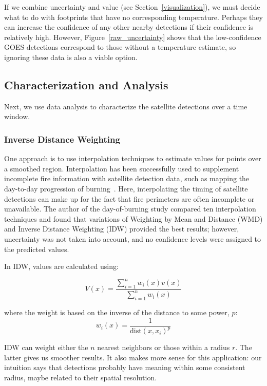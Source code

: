 If we combine uncertainty and value (see Section~\ref{visualization}), we must decide what to do with footprints that have no corresponding temperature. Perhaps they can increase the confidence of any other nearby detections if their confidence is relatively high. However, Figure~\ref{raw_uncertainty} shows that the low-confidence GOES detections correspond to those without a temperature estimate, so ignoring these data is also a viable option.

\subsection{Characterization and Analysis}
Next, we use data analysis to characterize the satellite detections over a time window. 
\subsubsection{Inverse Distance Weighting}
One approach is to use interpolation techniques to estimate values for points over a smoothed region. Interpolation has been successfully used to supplement incomplete fire information with satellite detection data, such as mapping the day-to-day progression of burning~\cite{Parks2014}. Here, interpolating the timing of satellite detections can make up for the fact that fire perimeters are often incomplete or unavailable. The author of the day-of-burning study compared ten interpolation techniques and found that variations of Weighting by Mean and Distance (WMD) and Inverse Distance Weighting (IDW) provided the best results; however, uncertainty was not taken into account, and no confidence levels were assigned to the predicted values.

In IDW, values are calculated using:

\begin{equation}
V(x) = \frac{\sum_{i=1}^{n}w_i(x)v(x)}{\sum_{i=1}^{n}w_i(x)}
\end{equation}

where the weight is based on the inverse of the distance to some power, $p$:
\begin{equation}
w_i(x) = \frac{1}{\mathrm{dist}(x, x_i)^p}
\end{equation}

IDW can weight either the $n$ nearest neighbors or those within a radius $r$. The latter gives us smoother results. It also makes more sense for this application: our intuition says that detections probably have meaning within some consistent radius, maybe related to their spatial resolution.

